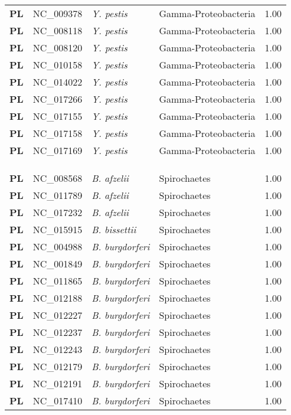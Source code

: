 \begin{adjustwidth}{-3cm}{2cm}
{\begin{supertabular}{>{\bfseries}l|p{0.1\textwidth}p{0.14\textwidth}l|l}
PL & NC\_009378 & \textit{Y. pestis} & Gamma-Proteobacteria & 1.00\\
PL & NC\_008118 & \textit{Y. pestis} & Gamma-Proteobacteria & 1.00\\
PL & NC\_008120 & \textit{Y. pestis} & Gamma-Proteobacteria & 1.00\\
PL & NC\_010158 & \textit{Y. pestis} & Gamma-Proteobacteria & 1.00\\
PL & NC\_014022 & \textit{Y. pestis} & Gamma-Proteobacteria & 1.00\\
PL & NC\_017266 & \textit{Y. pestis} & Gamma-Proteobacteria & 1.00\\
PL & NC\_017155 & \textit{Y. pestis} & Gamma-Proteobacteria & 1.00\\
PL & NC\_017158 & \textit{Y. pestis} & Gamma-Proteobacteria & 1.00\\
PL & NC\_017169 & \textit{Y. pestis} & Gamma-Proteobacteria & 1.00\\
\\
\\
\hline\\
PL & NC\_008568 & \textit{B. afzelii} & Spirochaetes & 1.00\\
PL & NC\_011789 & \textit{B. afzelii} & Spirochaetes & 1.00\\
PL & NC\_017232 & \textit{B. afzelii} & Spirochaetes & 1.00\\
PL & NC\_015915 & \textit{B. bissettii} & Spirochaetes & 1.00\\
PL & NC\_004988 & \textit{B. burgdorferi} & Spirochaetes & 1.00\\
PL & NC\_001849 & \textit{B. burgdorferi} & Spirochaetes & 1.00\\
PL & NC\_011865 & \textit{B. burgdorferi} & Spirochaetes & 1.00\\
PL & NC\_012188 & \textit{B. burgdorferi} & Spirochaetes & 1.00\\
PL & NC\_012227 & \textit{B. burgdorferi} & Spirochaetes & 1.00\\
PL & NC\_012237 & \textit{B. burgdorferi} & Spirochaetes & 1.00\\
PL & NC\_012243 & \textit{B. burgdorferi} & Spirochaetes & 1.00\\
PL & NC\_012179 & \textit{B. burgdorferi} & Spirochaetes & 1.00\\
PL & NC\_012191 & \textit{B. burgdorferi} & Spirochaetes & 1.00\\
PL & NC\_017410 & \textit{B. burgdorferi} & Spirochaetes & 1.00\\

\end{supertabular}}
\end{adjustwidth}
